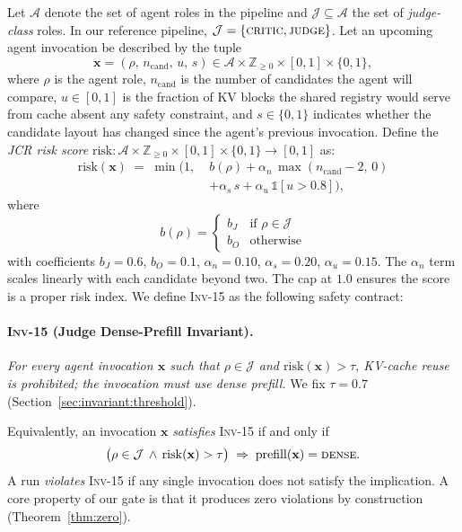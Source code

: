 \documentclass[10pt,twocolumn]{article}
\newcommand{\INV}[1]{\textsc{Inv-#1}}
\newcommand{\Risk}{\mathrm{risk}}
\newcommand{\Judge}{\mathcal{J}}
\newcommand{\Cand}{n_{\text{cand}}}
\newcommand{\Reuse}{u}
\newcommand{\Shuf}{s}
\begin{document}
Let $\mathcal{A}$ denote the set of agent roles in the pipeline and
$\Judge \subseteq \mathcal{A}$ the set of \emph{judge-class} roles. In our
reference pipeline, $\Judge = \{\textsc{critic}, \textsc{judge}\}$. Let an
upcoming agent invocation be described by the tuple
\begin{equation*}
  \mathbf{x} = (\rho,\, \Cand,\, \Reuse,\, \Shuf) \in \mathcal{A}
                  \times \mathbb{Z}_{\geq 0}
                  \times [0,1] \times \{0,1\},
\end{equation*}
where $\rho$ is the agent role, $\Cand$ is the number of candidates the
agent will compare, $\Reuse \in [0,1]$ is the fraction of KV blocks the
shared registry would serve from cache absent any safety constraint, and
$\Shuf \in \{0,1\}$ indicates whether the candidate layout has changed
since the agent's previous invocation. Define the \emph{JCR risk score}
$\Risk : \mathcal{A} \times \mathbb{Z}_{\geq 0} \times [0,1] \times \{0,1\}
\rightarrow [0,1]$ as:
\begin{align}
  \Risk(\mathbf{x}) \;=\; \min\Big(1,\;
    & b(\rho)
      + \alpha_n\,\max(\Cand - 2,\, 0) \nonumber \\[-2pt]
    & + \alpha_s\,\Shuf
      + \alpha_u\,\mathbb{1}[\Reuse > 0.8]
    \Big),
  \label{eq:risk}
\end{align}
where
\begin{equation}
  b(\rho) =
  \begin{cases}
    b_J & \text{if } \rho \in \Judge \\
    b_O & \text{otherwise}
  \end{cases}
  \label{eq:base}
\end{equation}
with coefficients $b_J = 0.6$, $b_O = 0.1$, $\alpha_n = 0.10$,
$\alpha_s = 0.20$, $\alpha_u = 0.15$. The $\alpha_n$ term scales linearly with
each candidate beyond two. The cap at $1.0$ ensures the score is
a proper risk index. We define \INV{15} as the following safety
contract:

\paragraph{\INV{15} (Judge Dense-Prefill Invariant).}
\emph{For every agent invocation $\mathbf{x}$ such that
$\rho \in \Judge$ and $\Risk(\mathbf{x}) > \tau$, KV-cache reuse is
prohibited; the invocation must use dense prefill.} We fix $\tau = 0.7$
(Section~\ref{sec:invariant:threshold}).

Equivalently, an invocation $\mathbf{x}$ \emph{satisfies} \INV{15} if and
only if
\begin{equation}
  \big(\rho \in \Judge \,\wedge\, \Risk(\mathbf{x}) > \tau\big)
  \;\Rightarrow\;
  \mathrm{prefill}(\mathbf{x}) = \textsc{dense}.
  \label{eq:inv15}
\end{equation}
A run \emph{violates} \INV{15} if any single invocation does not satisfy
the implication. A core property of our gate is that it produces zero
violations by construction (Theorem~\ref{thm:zero}).
\end{document}
